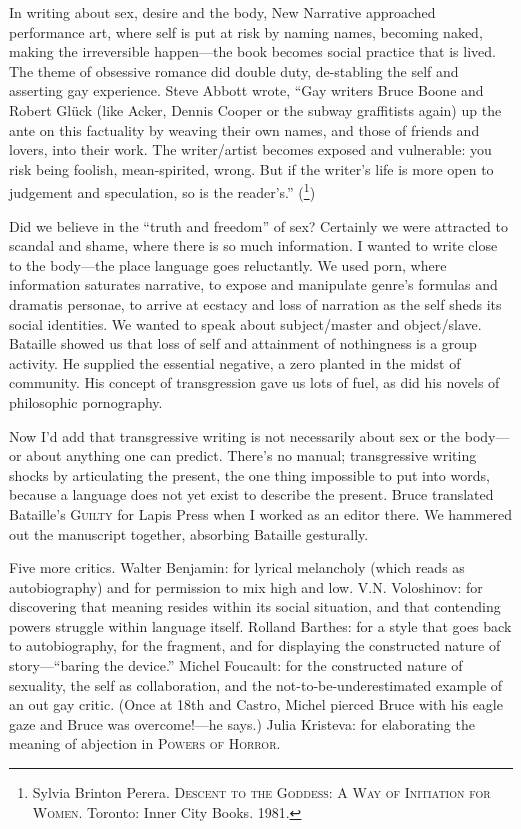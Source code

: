 \documentclass[
]{memoir}
\begin{document}
In writing about sex, desire and the body, New Narrative approached
performance art, where self is put at risk by naming names, becoming
naked, making the irreversible happen---the book becomes social practice
that is lived. The theme of obsessive romance did double duty,
de-stabling the self and asserting gay experience. Steve Abbott wrote,
``Gay writers Bruce Boone and Robert Glück (like Acker, Dennis Cooper or
the subway graffitists again) up the ante on this factuality by weaving
their own names, and those of friends and lovers, into their work. The
writer/artist becomes exposed and vulnerable: you risk being foolish,
mean-spirited, wrong. But if the writer's life is more open to judgement
and speculation, so is the reader's.'' (\footnote{Sylvia Brinton Perera.
  \textsc{Descent to the Goddess: A Way of Initiation for Women}.
  Toronto: Inner City Books. 1981.})

Did we believe in the ``truth and freedom'' of sex? Certainly we were
attracted to scandal and shame, where there is so much information. I
wanted to write close to the body---the place language goes reluctantly.
We used porn, where information saturates narrative, to expose and
manipulate genre's formulas and dramatis personae, to arrive at ecstacy
and loss of narration as the self sheds its social identities. We wanted
to speak about subject/master and object/slave. Bataille showed us that
loss of self and attainment of nothingness is a group activity. He
supplied the essential negative, a zero planted in the midst of
community. His concept of transgression gave us lots of fuel, as did his
novels of philosophic pornography.

Now I'd add that transgressive writing is not necessarily about sex or
the body---or about anything one can predict. There's no manual;
transgressive writing shocks by articulating the present, the one thing
impossible to put into words, because a language does not yet exist to
describe the present. Bruce translated Bataille's \textsc{Guilty} for
Lapis Press when I worked as an editor there. We hammered out the
manuscript together, absorbing Bataille gesturally.

Five more critics. Walter Benjamin: for lyrical melancholy (which reads
as autobiography) and for permission to mix high and low. V.N.
Voloshinov: for discovering that meaning resides within its social
situation, and that contending powers struggle within language itself.
Rolland Barthes: for a style that goes back to autobiography, for the
fragment, and for displaying the constructed nature of story---``baring
the device.'' Michel Foucault: for the constructed nature of sexuality,
the self as collaboration, and the not-to-be-underestimated example of
an out gay critic. (Once at 18th and Castro, Michel pierced Bruce with
his eagle gaze and Bruce was overcome!---he says.) Julia Kristeva: for
elaborating the meaning of abjection in \textsc{Powers of Horror}.
\end{document}
